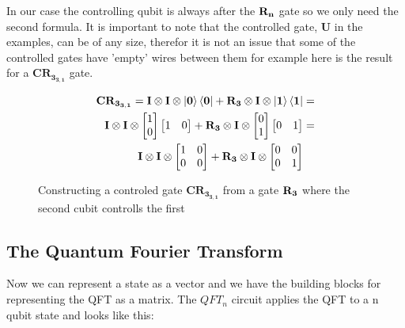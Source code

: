 In our case the controlling qubit is always after the $\mathbf{R_{n}}$ gate so we only need the second formula. 
It is important to note that the controlled gate, $\mathbf{U}$ in the examples, can be of any size, therefor it is not an issue that some of the controlled gates have 'empty' wires between them for example here is the result for a $\mathbf{CR_{3_{3,1}}}$ gate. 
\begin{figure}[H]
    \begin{align*}
        \mathbf{CR_{3_{3,1}}}=\mathbf{I}\otimes\mathbf{I}\otimes\ket{\mathbf{0}}\bra{\mathbf{0}} + \mathbf{R_{3}}\otimes\mathbf{I}\otimes\ket{\mathbf{1}}\bra{\mathbf{1}}&=\\
        \mathbf{I}\otimes\mathbf{I}\otimes
        \begin{bmatrix}
            1 \\
            0 \\
        \end{bmatrix}
        \begin{bmatrix}
            1 & 0 \\
        \end{bmatrix}+
        \mathbf{R_{3}}\otimes\mathbf{I}\otimes
        \begin{bmatrix}
            0 \\
            1 \\
        \end{bmatrix}
        \begin{bmatrix}
            0 & 1 \\
        \end{bmatrix}
        &=\\
        \mathbf{I}\otimes\mathbf{I}\otimes
        \begin{bmatrix}
            1 & 0 \\
            0 & 0 \\
        \end{bmatrix}+ 
        \mathbf{R_{3}}\otimes\mathbf{I}\otimes
        \begin{bmatrix}
            0 & 0 \\
            0 & 1 \\
        \end{bmatrix}& 
    \end{align*}
    \caption{Constructing a controled gate $\mathbf{CR_{3_{3,1}}}$ from a gate $\mathbf{R_{3}}$ where the second cubit controlls the first}
    \label{fig:CR3}
\end{figure}

\subsection{The Quantum Fourier Transform}\label{sec:qft}
Now we can represent a state as a vector and we have the building blocks for representing the QFT as a matrix. The $QFT_n$ circuit applies the QFT to a n qubit state and looks like this:

